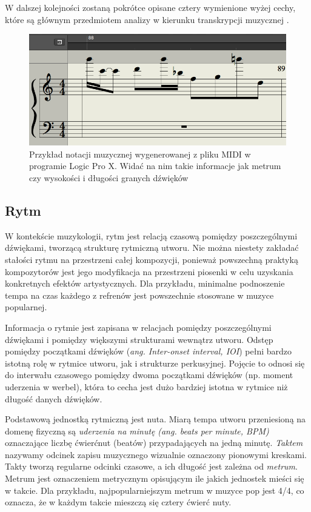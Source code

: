\documentclass[12pt,a4paper,twoside]{mwart}
\begin{document}
W dalszej kolejności zostaną pokrótce opisane cztery wymienione wyżej cechy, które są głównym przedmiotem analizy w kierunku transkrypcji muzycznej \cite[63]{Homerecording:DlaKazdego}.
\begin{figure}[h]
  \begin{center}
    \includegraphics[scale=0.5]{images/pieciolinia_logic.png}
    \caption{Przykład notacji muzycznej wygenerowanej z pliku MIDI w programie Logic Pro X. Widać na nim takie informacje jak metrum czy wysokości i długości granych dźwięków}
  \end{center}
\end{figure}

\subsection{Rytm}


W kontekście muzykologii, rytm jest relacją czasową pomiędzy poszczególnymi dźwiękami, tworzącą strukturę rytmiczną utworu. Nie można niestety zakładać stałości rytmu na przestrzeni całej kompozycji, ponieważ powszechną praktyką kompozytorów jest jego modyfikacja na przestrzeni piosenki w celu uzyskania konkretnych efektów artystycznych. Dla przykładu, minimalne podnoszenie tempa na czas każdego z refrenów jest powszechnie stosowane w muzyce popularnej.

Informacja o rytmie jest zapisana w relacjach pomiędzy poszczególnymi dźwiękami i pomiędzy większymi strukturami wewnątrz utworu. Odstęp pomiędzy początkami dźwięków (\textit{ang. Inter-onset interval, IOI}) pełni bardzo istotną rolę w rytmice utworu, jak i strukturze perkusyjnej. Pojęcie to odnosi się do interwału czasowego pomiędzy dwoma początkami dźwięków (np. moment uderzenia w werbel), która to cecha jest dużo bardziej istotna w rytmice niż długość danych dźwięków. \cite[473-500]{Transcription:Clarke:RhythmAndTiming}

Podstawową jednostką rytmiczną jest nuta. Miarą tempa utworu przeniesioną na domenę fizyczną są \textit{uderzenia na minutę} \textit{(ang. beats per minute, BPM)} oznaczające liczbę ćwierćnut (beatów) przypadających na jedną minutę. \textit{Taktem} nazywamy odcinek zapisu muzycznego wizualnie oznaczony pionowymi kreskami. Takty tworzą regularne odcinki czasowe, a ich długość jest zależna od \textit{metrum}. Metrum jest oznaczeniem metrycznym opisującym ile jakich jednostek mieści się w takcie. Dla przykładu, najpopularniejszym metrum w muzyce pop jest 4/4, co oznacza, że w każdym takcie mieszczą się cztery ćwierć nuty.
\end{document}
